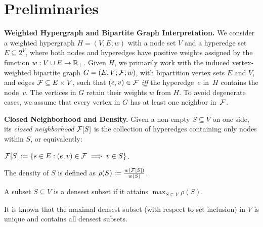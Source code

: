 \section{Preliminaries}
\label{sec:prelim}


\noindent \textbf{Weighted Hypergraph and Bipartite Graph Interpretation.}
We consider a weighted hypergraph $H = (V, E; w)$ with a node set $V$ and a hyperedge set $E \subseteq 2^V$, where both nodes and hyperedges have positive weights assigned by the function $w: V \cup E \rightarrow \mathbb{R}_+$. Given $H$, we primarily work with the induced vertex-weighted bipartite graph $G = (E, V; \mathcal {F}; w)$, with bipartition vertex sets $E$ and $V$, and edges $\mathcal {F} \subseteq E \times V$, such that $(e, v) \in \mathcal {F}$ \emph{iff} the hyperedge~$e$ in~$H$ contains the node~$v$. The vertices in $G$ retain their weights $w$ from $H$. To avoid degenerate cases, we assume that every vertex in $G$ has at least one neighbor in~$\mathcal {F}$.


\noindent \textbf{Closed Neighborhood and Density.}
Given a non-empty $S \subseteq V$ on one side, its \emph{closed neighborhood} $\mathcal {F}[S]$ is the collection of hyperedges containing only nodes within $S$, or equivalently:


$\mathcal {F}[S] := \{e \in E: (e, v) \in \mathcal {F} \implies v \in S\}$.

The density of $S$ is defined as  $\rho(S) := \frac{w(\mathcal {F}[S])}{w(S)}$. 



%


\begin{definition}
	\label{defn:densest}
	A subset $S \subseteq V$ is a densest subset
	if it attains $\max_{S \subseteq V} \rho(S)$.
	
	It is known that 
	the maximal densest subset (with respect to set inclusion) in $V$ is unique
	and contains all densest subsets.
\end{definition}

